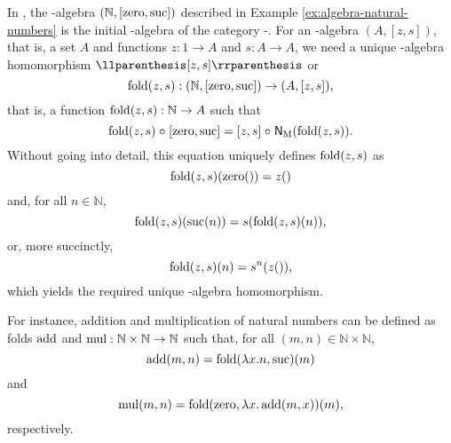 \begin{example}%
  \label{ex:initial-algebra-natural-numbers}


  In \set, the -algebra $(\mathbb{N},[\operatorname{zero},\operatorname{suc}])$ described
  in Example \ref{ex:algebra-natural-numbers} is the initial
  -algebra of the category -\alg. For an
  -algebra $(A,[z,s])$, that is, a set $A$ and functions $z: 1
  \to A$ and $s: A \to A$, we need a unique -algebra
  homomorphism $\cata{[z,s]}$ or
  \begin{equation*}
    \operatorname{fold}(z,s): (\mathbb{N},[\operatorname{zero},\operatorname{suc}]) \to (A,[z,s])
    \text{,}
  \end{equation*}
  that is, a function $\operatorname{fold}(z,s): \mathbb{N} \to A$ such that
  \begin{equation*}
    \operatorname{fold}(z,s) \mathrel{\circ} [\operatorname{zero},\operatorname{suc}] = [z,s] \mathrel{\circ} \mathsf{N}_{\operatorname{M}}(\operatorname{fold}(z,s))
    \text{.}
  \end{equation*}
  Without going into detail, this equation uniquely defines
  $\operatorname{fold}(z,s)$ as
  \begin{equation*}
    \operatorname{fold}(z,s)(\operatorname{zero}()) = z()
  \end{equation*}
  and, for all $n \in \mathbb{N}$,
  \begin{equation*}
    \operatorname{fold}(z,s)(\operatorname{suc}(n)) = s(\operatorname{fold}(z,s)(n))
    \text{,}
  \end{equation*}
  or, more succinctly,
  \begin{equation*}
    \operatorname{fold}(z,s)(n) = s^{n}(z())
    \text{,}
  \end{equation*}
  which yields the required unique -algebra homomorphism.

  For instance, addition and multiplication of natural numbers can be
  defined as folds $\operatorname{add}$ and $\operatorname{mul}: \mathbb{N} \times \mathbb{N} \to
  \mathbb{N}$ such that, for all $(m,n) \in \mathbb{N} \times
  \mathbb{N}$,
  \begin{equation*}
    \operatorname{add}(m,n) = \operatorname{fold}(\lambda x.n,\operatorname{suc})(m)
  \end{equation*}
  and
  \begin{equation*}
    \operatorname{mul}(m,n) = \operatorname{fold}(\operatorname{zero},\lambda x.\operatorname{add}(m,x))(m)
    \text{,}
  \end{equation*}
  respectively.

\end{example}

